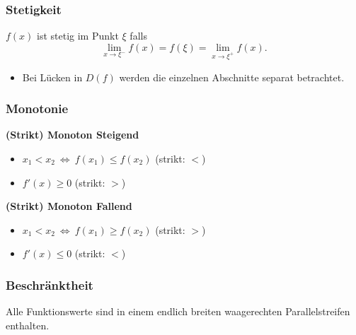     \subsubsection{Stetigkeit}
        $f(x)$ ist stetig im Punkt $\xi$ falls
        $$
            \lim_{x\to\xi^-} f(x) = f(\xi) = \lim_{x\to\xi^+} f(x).
        $$
        \begin{itemize}
            \item Bei Lücken in $D(f)$ werden die einzelnen Abschnitte separat betrachtet.
        \end{itemize}
    \subsubsection{Monotonie}
        \textbf{(Strikt) Monoton Steigend}
            \begin{itemize}
                \item $x_1 < x_2\ \Longleftrightarrow\ f(x_1) \leq f(x_2)$ \hfill (strikt: $<$)
                \item $f'(x) \geq 0$ \hfill (strikt: $>$)
            \end{itemize}
        \textbf{(Strikt) Monoton Fallend}
            \begin{itemize}
                \item $x_1 < x_2\ \Longleftrightarrow\ f(x_1) \geq f(x_2)$ \hfill (strikt: $>$)
                \item $f'(x) \leq 0$ \hfill (strikt: $<$)
            \end{itemize}
    \subsubsection{Beschränktheit}
        Alle Funktionswerte sind in einem endlich breiten waagerechten Parallelstreifen enthalten.

